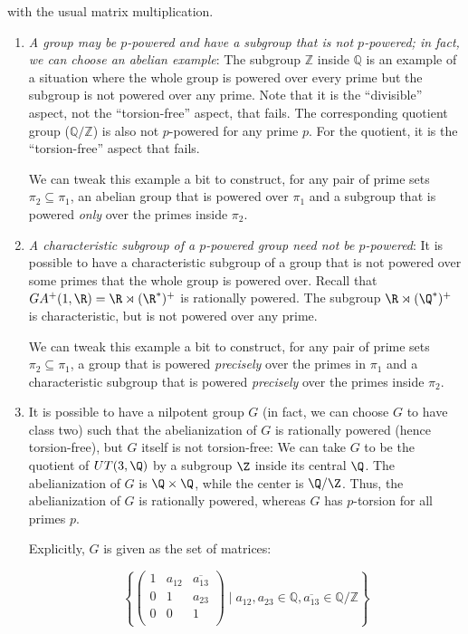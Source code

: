 \documentclass{ucetd}
\begin{document}
with the usual matrix multiplication.
\begin{enumerate}
\item {\em A group may be $p$-powered and have a subgroup that is not
  $p$-powered; in fact, we can choose an abelian example}: The
  subgroup $\mathbb{Z}$ inside $\mathbb{Q}$ is an example of a
  situation where the whole group is powered over every prime but the
  subgroup is not powered over any prime. Note that it is the
  ``divisible'' aspect, not the ``torsion-free'' aspect, that
  fails. The corresponding quotient group ($\mathbb{Q}/\mathbb{Z}$) is
  also not $p$-powered for any prime $p$. For the quotient, it is the
  ``torsion-free'' aspect that fails.

  We can tweak this example a bit to construct, for any pair of prime
  sets $\pi_2 \subseteq \pi_1$, an abelian group that is powered over
  $\pi_1$ and a subgroup that is powered {\em only} over the primes
  inside $\pi_2$.
\item {\em A characteristic subgroup of a $p$-powered group need not
  be $p$-powered}: It is possible to have a characteristic subgroup of
  a group that is not powered over some primes that the whole group is
  powered over. Recall that $GA^+(1,\R) = \R \rtimes (\R^*)^+$ is
  rationally powered. The subgroup $\R \rtimes (\Q^*)^+$ is
  characteristic, but is not powered over any prime.  

  We can tweak this example a bit to construct, for any pair of prime
  sets $\pi_2 \subseteq \pi_1$, a group that is powered {\em
    precisely} over the primes in $\pi_1$ and a characteristic
  subgroup that is powered {\em precisely} over the primes inside
  $\pi_2$.

\item It is possible to have a nilpotent group $G$ (in fact, we can
  choose $G$ to have class two) such that the abelianization of $G$ is
  rationally powered (hence torsion-free), but $G$ itself is not
  torsion-free: We can take $G$ to be the quotient of $UT(3,\Q)$ by a
  subgroup $\Z$ inside its central $\Q$. The abelianization of $G$ is
  $\Q \times \Q$, while the center is $\Q/\Z$. Thus, the
  abelianization of $G$ is rationally powered, whereas $G$ has
  $p$-torsion for all primes $p$.

  Explicitly, $G$ is given as the set of matrices:

  $$\left \{ \begin{pmatrix} 1 & a_{12} & \overline{a_{13}} \\ 0 & 1 & a_{23} \\ 0 & 0 & 1 \\\end{pmatrix} \mid a_{12},a_{23} \in \mathbb{Q}, \overline{a_{13}} \in \mathbb{Q}/\mathbb{Z} \right \}$$
    

\end{enumerate}
\end{document}
